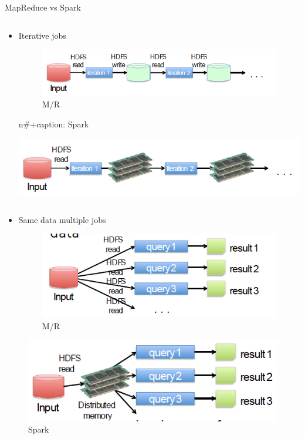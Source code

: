\documentclass[presentation, aspectratio=169]{beamer}
\begin{document}
\begin{frame}[label={sec:org171b951},t]{MapReduce vs Spark}
\begin{column}{0.5\columnwidth}
\begin{itemize}
\item Iterative jobs
 \begin{figure}[htbp]
\centering
\includegraphics[width=.9\linewidth]{./img/mr-iterative.png}
\caption{\label{fig:orgbbc37f3}M/R}
\end{figure}
n\#+caption: Spark 
\begin{center}
\includegraphics[width=.9\linewidth]{./img/spark-iterative.png}
\label{orgef90637}
\end{center}
\end{itemize}
\end{column}

\begin{column}{0.5\columnwidth}
\begin{itemize}
\item Same data multiple jobs
\begin{figure}[htbp]
\centering
\includegraphics[width=.9\linewidth]{./img/map-multiple.png}
\caption{\label{fig:orgca23053}M/R}
\end{figure}
\end{itemize}
\begin{figure}[htbp]
\centering
\includegraphics[width=.9\linewidth]{./img/spark-multiple.png}
\caption{\label{fig:org9b5503f}Spark}
\end{figure}
\end{column}
\end{frame}
\end{document}

